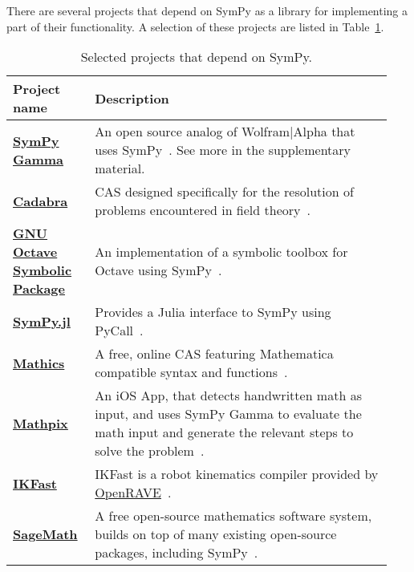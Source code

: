 There are several projects that depend on SymPy as a library for implementing
a part of their functionality. A selection of these projects are listed in
Table~\ref{projects-table}.

\begin{longtable}[htbc]{>{\raggedright}p{0.2\linewidth}p{0.74\linewidth}}
\caption{Selected projects that depend on SymPy.\label{projects-table}}\\
\toprule
\textbf{Project name} & \textbf{Description} \\
\midrule

\href{http://sympygamma.com/}{\textbf{SymPy Gamma}} & An open source
  analog of Wolfram|Alpha that uses SymPy~\cite{SymPyGamma}.  See more in the supplementary material. \\

\href{http://cadabra.science/index.html}{\textbf{Cadabra}} &
  CAS designed specifically for the resolution of problems
  encountered in field theory~\cite{Peeters2007cadabra}. \\

\href{https://github.com/cbm755/octsympy}{\textbf{GNU Octave Symbolic Package}} &
  An implementation of a symbolic toolbox for Octave using SymPy~\cite{OctSymPy}. \\

\href{https://github.com/jverzani/SymPy.jl}{\textbf{SymPy.jl}} &
  Provides a Julia interface to SymPy using PyCall~\cite{SymPy.jl}. \\

\href{https://mathics.github.io/}{\textbf{Mathics}} &
  A free, online CAS featuring Mathematica compatible
  syntax and functions~\cite{Mathics}. \\

\href{http://mathpix.com/}{\textbf{Mathpix}} & An iOS App, that detects handwritten math as input, and uses
  SymPy Gamma to evaluate the math input and generate the relevant
  steps to solve the problem~\cite{Mathpix}. \\

\href{http://openrave.org/docs/latest_stable/openravepy/ikfast/}{\textbf{IKFast}} &
  IKFast is a robot kinematics compiler provided by
  \href{http://openrave.org/}{OpenRAVE}~\cite{diankov2010ikfast}. \\

\href{http://www.sagemath.org/}{\textbf{SageMath}} &
  A free open-source mathematics software system, builds on top of many
  existing open-source packages, including SymPy~\cite{sagemath}. \\


\end{longtable}

